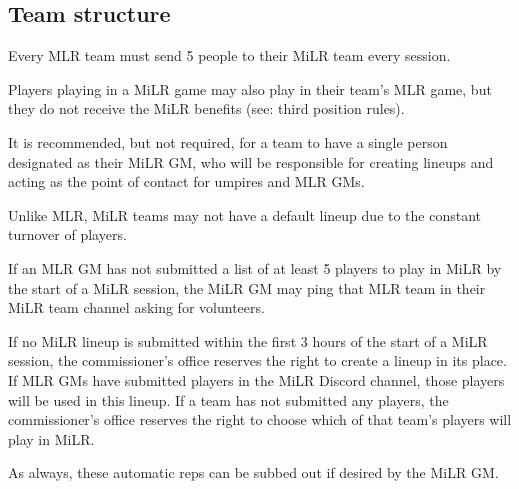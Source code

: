 \subsection{Team structure}
\begin{deepEnumerate}
	\item Every MLR team must send 5 people to their MiLR team every session.
    \item Players playing in a MiLR game may also play in their team’s MLR game, 
    but they do not receive the MiLR benefits (see: third position rules).
    \item It is recommended, but not required, for a team to have a single person designated as their MiLR GM, 
    who will be responsible for creating lineups and acting as the point of contact for umpires and MLR GMs.
    \item Unlike MLR, MiLR teams may not have a default lineup due to the constant turnover of players.
    \begin{deepEnumerate}
        \item If an MLR GM has not submitted a list of at least 5 players to play in MiLR by the start of a MiLR session, 
        the MiLR GM may ping that MLR team in their MiLR team channel asking for volunteers. 
        \item If no MiLR lineup is submitted within the first 3 hours of the start of a MiLR session, 
        the commissioner’s office reserves the right to create a lineup in its place. 
        If MLR GMs have submitted players in the MiLR Discord channel, those players will be used in this lineup. 
        If a team has not submitted any players, 
        the commissioner’s office reserves the right to choose which of that team’s players will play in MiLR.
        \begin{deepEnumerate}
            \item As always, these automatic reps can be subbed out if desired by the MiLR GM.
        \end{deepEnumerate}
    \end{deepEnumerate}
\end{deepEnumerate}

